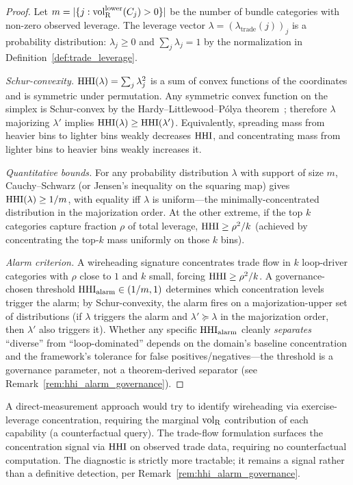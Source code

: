 \begin{proof}
Let $m = |\{j : {\operatorname{vol}_{\mathrm{R}}^{\mathrm{lower}}}(C_j) > 0\}|$ be the number of bundle
categories with non-zero observed leverage.  The leverage vector
$\lambda = (\lambda_{\mathrm{trade}}(j))_j$ is a probability
distribution: $\lambda_j \geq 0$ and $\sum_j \lambda_j = 1$ by
the normalization in Definition~\ref{def:trade_leverage}.

\emph{Schur-convexity.}
$\mathrm{HHI}(\lambda) = \sum_j \lambda_j^2$ is a sum of convex functions
of the coordinates and is symmetric under permutation.  Any
symmetric convex function on the simplex is Schur-convex by the
Hardy--Littlewood--P\'olya
theorem~\citep{hardy1929majorization,marshall2011inequalities};
therefore $\lambda$ majorizing $\lambda'$ implies $\mathrm{HHI}(\lambda)
\geq \mathrm{HHI}(\lambda')$.  Equivalently, spreading mass from heavier
bins to lighter bins weakly decreases $\mathrm{HHI}$, and concentrating
mass from lighter bins to heavier bins weakly increases it.

\emph{Quantitative bounds.}
For any probability distribution $\lambda$ with support of size
$m$, Cauchy--Schwarz (or Jensen's inequality on the squaring
map) gives $\mathrm{HHI}(\lambda) \geq 1/m$, with equality iff $\lambda$
is uniform---the minimally-concentrated distribution in the
majorization order.  At the other extreme, if the top $k$
categories capture fraction $\rho$ of total leverage,
$\mathrm{HHI} \geq \rho^2/k$ (achieved by concentrating the top-$k$ mass
uniformly on those $k$ bins).

\emph{Alarm criterion.}
A wireheading signature concentrates trade flow in $k$
loop-driver categories with $\rho$ close to $1$ and $k$ small,
forcing $\mathrm{HHI} \geq \rho^2/k$.  A governance-chosen threshold
$\mathrm{HHI}_{\mathrm{alarm}} \in (1/m, 1)$ determines which
concentration levels trigger the alarm; by Schur-convexity, the
alarm fires on a majorization-upper set of distributions (if
$\lambda$ triggers the alarm and $\lambda' \succeq \lambda$ in
the majorization order, then $\lambda'$ also triggers it).
Whether any specific $\mathrm{HHI}_{\mathrm{alarm}}$ cleanly
\emph{separates} ``diverse'' from ``loop-dominated'' depends on
the domain's baseline concentration and the framework's
tolerance for false positives/negatives---the threshold is a
governance parameter, not a theorem-derived separator (see
Remark~\ref{rem:hhi_alarm_governance}).
\end{proof}

\begin{remark}
A direct-measurement approach would try to identify wireheading
via exercise-leverage concentration, requiring the marginal
${\operatorname{vol}_{\mathrm{R}}}$ contribution of each capability (a counterfactual query).
The trade-flow formulation surfaces the concentration signal via
$\mathrm{HHI}$ on observed trade data, requiring no counterfactual
computation.  The diagnostic is strictly more tractable; it
remains a signal rather than a definitive detection, per
Remark~\ref{rem:hhi_alarm_governance}.
\end{remark}

